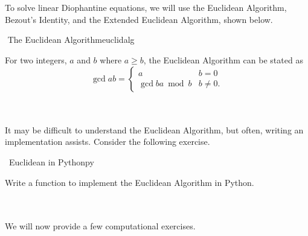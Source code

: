     \vphantom
    \\
    \\
    To solve linear Diophantine equations, we will use the Euclidean Algorithm, Bezout's Identity, and the Extended Euclidean Algorithm, shown below.
    \begin{theorem}{\Stop\,\,The Euclidean Algorithm}{euclidalg}
    
        For two integers, \(a\) and \(b\) where \(a\geq b\), the Euclidean Algorithm can be stated as
        \begin{equation*}
            \gcd{a}{b}=\begin{cases}
                a & b = 0 \\
                \gcd{b}{a\bmod b} & b \neq 0.
            \end{cases}
        \end{equation*}
    
    \end{theorem}
    \vphantom
    \\
    \\
    It may be difficult to understand the Euclidean Algorithm, but often, writing an implementation assists. Consider the following exercise.
    \begin{exercise}{\Difficulty\,\Difficulty\,\,Euclidean in Python}{py}
    
        Write a function to implement the Euclidean Algorithm in Python.
        \begin{center}
            
        \end{center}
    
    \end{exercise}
    \pagebreak
    \vphantom
    \\
    \\
    We will now provide a few computational exercises.
